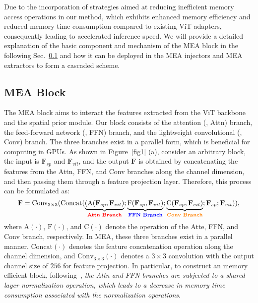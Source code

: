 %
%
Due to the incorporation of strategies aimed at reducing inefficient memory access operations in our method, which exhibits enhanced memory efficiency and reduced memory time consumption compared to existing ViT adapters, consequently leading to accelerated inference speed.
%
We will provide a detailed explanation of the basic component and mechanism of the MEA block in the following Sec.~\ref{sec:3:2} and how it can be deployed in the MEA injectors and MEA extractors to form a cascaded scheme.


\subsection{MEA Block}
\label{sec:3:2}
The MEA block aims to interact the features extracted from the ViT backbone and the spatial prior module. Our block consists of the attention (\ie, Attn) branch, the feed-forward network (\ie, FFN) branch, and the lightweight convolutional (\ie, Conv) branch. The three branches exist in a parallel form, which is beneficial for computing in GPUs.
%
As shown in Figure~\ref{fig1} (a), consider an arbitrary block, the input is $\textbf{F}_{sp}$ and $\textbf{F}_{vit}$, and the output $\textbf{F}$ is obtained by concatenating the features from the Attn, FFN, and Conv branches along the channel dimension, and then passing them through a feature projection layer. Therefore, this process can be formulated as:
\begin{equation}
\textbf{F} = \textrm{Conv}_{3 \times 3}(\textrm{Concat}(
\underbrace{(\textrm{A}(\textbf{F}_{sp},\textbf{F}_{vit})}_{\textrm{\textbf{\textcolor{red}{Attn Branch}}}};
\underbrace{\textrm{F}(\textbf{F}_{sp},\textbf{F}_{vit})}_{\textrm{\textbf{\textcolor{blue}{FFN Branch}}}};
\underbrace{\textrm{C}(\textbf{F}_{sp},\textbf{F}_{vit})}_{\textrm{\textbf{\textcolor{orange}{Conv Branch}}}};\textbf{F}_{sp};\textbf{F}_{vit})),
\label{eq:1}
\end{equation}
where $\textrm{A} (\cdot)$, $\textrm{F} (\cdot)$, and $\textrm{C} (\cdot)$ denote the operation of the Atte, FFN, and Conv branch, respectively. In MEA, these three branches exist in a parallel manner. $\textrm{Concat} (\cdot)$ denotes the feature concatenation operation along the channel dimension, and $\textrm{Conv}_{3 \times 3}(\cdot)$ denotes a $3 \times 3$ convolution with the output channel size of $256$ for feature projection. 
In particular, to construct an memory efficient block, following~\citep{he2023simplifying,wang2021gpt}, \emph{the Attn and FFN branches are subjected to a shared layer normalization operation, which leads to a decrease in memory time consumption associated with the normalization operations}.

